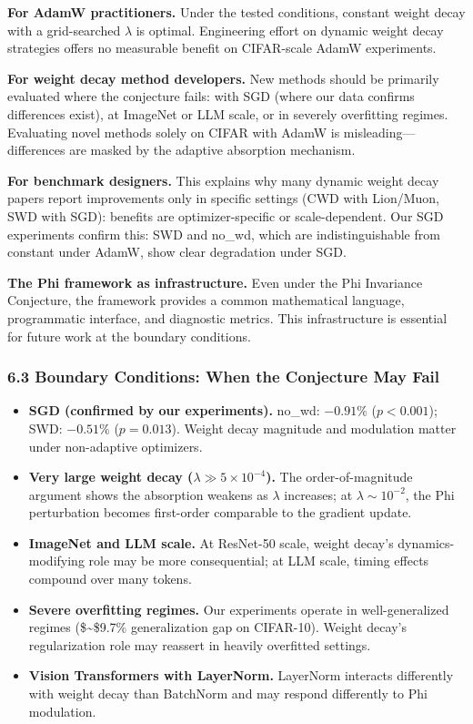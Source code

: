 \documentclass[
]{article}
\providecommand{\tightlist}{%
  \setlength{\itemsep}{0pt}\setlength{\parskip}{0pt}}
\begin{document}
\textbf{For AdamW practitioners.} Under the tested conditions, constant
weight decay with a grid-searched \(\lambda\) is optimal. Engineering
effort on dynamic weight decay strategies offers no measurable benefit
on CIFAR-scale AdamW experiments.

\textbf{For weight decay method developers.} New methods should be
primarily evaluated where the conjecture fails: with SGD (where our data
confirms differences exist), at ImageNet or LLM scale, or in severely
overfitting regimes. Evaluating novel methods solely on CIFAR with AdamW
is misleading---differences are masked by the adaptive absorption
mechanism.

\textbf{For benchmark designers.} This explains why many dynamic weight
decay papers report improvements only in specific settings (CWD with
Lion/Muon, SWD with SGD): benefits are optimizer-specific or
scale-dependent. Our SGD experiments confirm this: SWD and no\_wd, which
are indistinguishable from constant under AdamW, show clear degradation
under SGD.

\textbf{The Phi framework as infrastructure.} Even under the Phi
Invariance Conjecture, the framework provides a common mathematical
language, programmatic interface, and diagnostic metrics. This
infrastructure is essential for future work at the boundary conditions.

\hypertarget{boundary-conditions-when-the-conjecture-may-fail}{%
\subsubsection{6.3 Boundary Conditions: When the Conjecture May
Fail}\label{boundary-conditions-when-the-conjecture-may-fail}}

\begin{itemize}
\tightlist
\item
  \textbf{SGD (confirmed by our experiments).} no\_wd: \(-0.91\%\)
  (\(p < 0.001\)); SWD: \(-0.51\%\) (\(p = 0.013\)). Weight decay
  magnitude and modulation matter under non-adaptive optimizers.
\item
  \textbf{Very large weight decay (\(\lambda \gg 5 \times 10^{-4}\)).}
  The order-of-magnitude argument shows the absorption weakens as
  \(\lambda\) increases; at \(\lambda \sim 10^{-2}\), the Phi
  perturbation becomes first-order comparable to the gradient update.
\item
  \textbf{ImageNet and LLM scale.} At ResNet-50 scale, weight decay's
  dynamics-modifying role may be more consequential; at LLM scale,
  timing effects compound over many tokens.
\item
  \textbf{Severe overfitting regimes.} Our experiments operate in
  well-generalized regimes (\$\sim\$9.7\% generalization gap on
  CIFAR-10). Weight decay's regularization role may reassert in heavily
  overfitted settings.
\item
  \textbf{Vision Transformers with LayerNorm.} LayerNorm interacts
  differently with weight decay than BatchNorm and may respond
  differently to Phi modulation.
\end{itemize}
\end{document}
